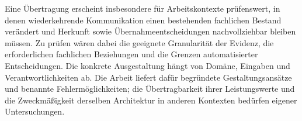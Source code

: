 Eine Übertragung erscheint insbesondere für Arbeitskontexte prüfenswert,
in denen wiederkehrende Kommunikation einen bestehenden fachlichen Bestand
verändert und Herkunft sowie Übernahmeentscheidungen nachvollziehbar
bleiben müssen. Zu prüfen wären dabei die geeignete Granularität der
Evidenz, die erforderlichen fachlichen Beziehungen und die Grenzen
automatisierter Entscheidungen. Die konkrete Ausgestaltung hängt von
Domäne, Eingaben und Verantwortlichkeiten ab. Die Arbeit liefert dafür
begründete Gestaltungsansätze und benannte Fehlermöglichkeiten; die
Übertragbarkeit ihrer Leistungswerte und die Zweckmäßigkeit derselben
Architektur in anderen Kontexten bedürfen eigener Untersuchungen.
